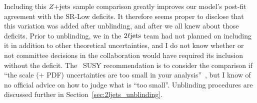 Including this $Z\mathrm{+jets}$ sample comparison greatly improves our model's post-fit
agreement with the SR-Low deficits.
It therefore seems proper to disclose that this variation was added after
unblinding, and after we all knew about those deficits.
Prior to unblinding, we in the $2\ell\mathrm{jets}$ team had not planned on including it
in addition to other theoretical uncertainties, and I do not know whether or
not committee decisions in the collaboration would have required its inclusion
without the deficit.
The \atlas\ SUSY recommendation is to consider the comparison if
``the scale ($+$ PDF) uncertainties are too small in your
analysis''~\cite{atlas_twiki_susytheoretical},
but I know of no official advice on how to judge what is ``too small''.
Unblinding procedures are discussed further in
Section~\ref{sec:2ljets_unblinding}.

